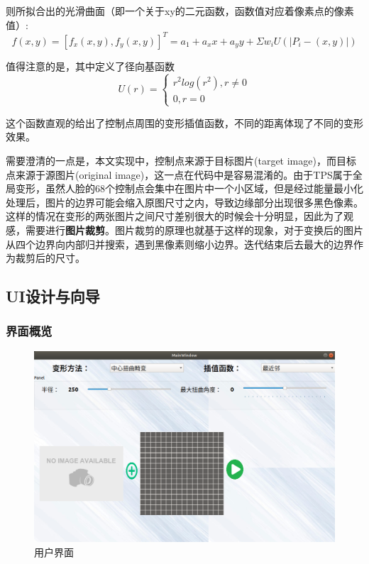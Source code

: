\documentclass[UTF8]{ctexart}
\begin{document}
则所拟合出的光滑曲面（即一个关于xy的二元函数，函数值对应着像素点的像素值）:
\begin{equation}
    f(x,y)=\left[
    f_x(x,y),f_y(x,y)    
    \right]^T
    =a_1+a_xx+a_yy+\Sigma w_iU(|P_i-(x,y)|)
\end{equation}

值得注意的是，其中定义了径向基函数$$U(r)=\begin{cases}
    r^2log(r^2),r\neq0\\
    0,r=0
\end{cases}
$$

这个函数直观的给出了控制点周围的变形插值函数，不同的距离体现了不同的变形效果。

需要澄清的一点是，本文实现中，控制点来源于目标图片(target image)，而目标点来源于源图片(original image)，这一点在代码中是容易混淆的。由于TPS属于全局变形，虽然人脸的68个控制点会集中在图片中一个小区域，但是经过能量最小化处理后，图片的边界可能会缩入原图尺寸之内，导致边缘部分出现很多黑色像素。这样的情况在变形的两张图片之间尺寸差别很大的时候会十分明显，因此为了观感，需要进行\textbf{图片裁剪}。图片裁剪的原理也就基于这样的现象，对于变换后的图片从四个边界向内部归并搜索，遇到黑像素则缩小边界。迭代结束后去最大的边界作为裁剪后的尺寸。

\subsection{UI设计与向导}

\subsubsection{界面概览}
\begin{figure}[H]
    \centering
    \includegraphics[scale=0.3]{images/report-images/manual.png}
    \caption{用户界面}
\end{figure}
\end{document}
